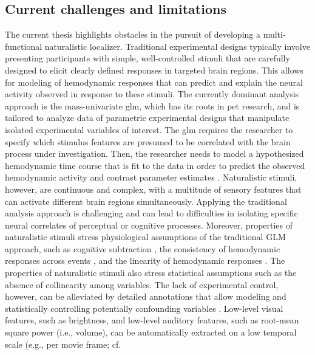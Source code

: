 \subsection{Current challenges and limitations}

%
The current thesis highlights obstacles in the pursuit of developing a
multi-functional naturalistic localizer.
%
Traditional experimental designs typically involve presenting participants with
simple, well-controlled stimuli that are carefully designed to elicit clearly
defined responses in targeted brain regions.
%
This allows for modeling of hemodynamic responses that can predict and explain
the neural activity observed in response to these stimuli.
%
The currently dominant analysis approach is the mass-univariate \ac{glm}, which
has its roots in \ac{pet} research, and is tailored to analyze data of
parametric experimental designs that manipulate isolated experimental variables
of interest.
%
The \ac{glm} requires the researcher to specify which stimulus features are
presumed to be correlated with the brain process under investigation.
%
Then, the researcher needs to model a hypothesized hemodynamic time course that
is fit to the data in order to predict the observed hemodynamic activity and
contrast parameter estimates \citep{friston1998event}.
%
Naturalistic stimuli, however, are continuous and complex, with a multitude of
sensory features that can activate different brain regions simultaneously.
%
Applying the traditional analysis approach is challenging and can lead to
difficulties in isolating specific neural correlates of perceptual or cognitive
processes.
%
Moreover, properties of naturalistic stimuli stress physiological assumptions of
the traditional GLM approach, such as cognitive subtraction
\citep{friston1996trouble}, the consistency of hemodynamic responses across
events \citep[the rationale behind \textit{trial-averaging};
cf.][]{dale1997selective}, and the linearity of hemodynamic responses
\citep{cohen1997parametric, boynton1996linear, dale1999optimal}.
%
The properties of naturalistic stimuli also stress statistical assumptions such
as the absence of collinearity among variables.
%
The lack of experimental control, however, can be alleviated by detailed
annotations that allow modeling and statistically controlling potentially
confounding variables \citep[e.g.,][]{deniz2019representation}.
%
Low-level visual features, such as brightness, and low-level auditory features,
such as root-mean square power (i.e., volume), can be automatically extracted on
a low temporal scale (e.g., per movie frame; cf.
